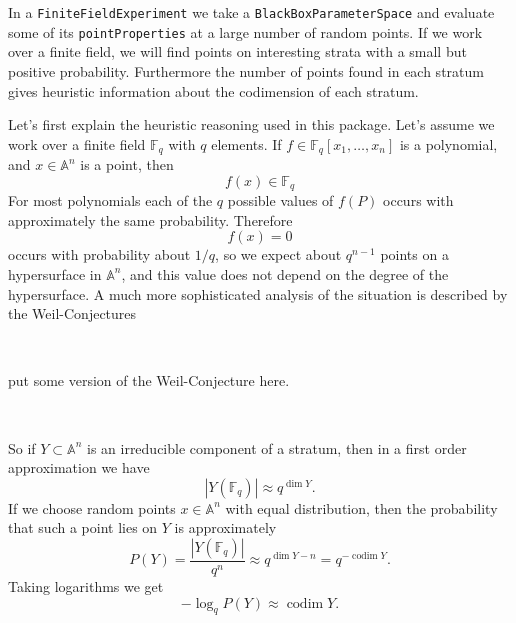 \documentclass[12pt,a4paper]{amsart}
\theoremstyle{plain}
\theoremstyle{definition}
\newcommand{\FF}{\mathbb F}
\renewcommand{\AA}{\mathbb A}
\DeclareMathOperator{\codim}{codim}
\begin{document}
In a {\tt FiniteFieldExperiment} we take a {\tt BlackBoxParameterSpace} and evaluate some of its {\tt pointProperties} at a large number of random points. If we work over a finite field, we will find points on interesting strata with a small but positive probability. Furthermore the number of points found in each stratum gives heuristic information about the codimension of each stratum.

Let's first explain the heuristic reasoning used in this package. Let's assume we work over a finite field $\FF_q$ with $q$ elements. If $f \in \FF_q[x_1,\dots,x_n]$ is a polynomial, and $x \in \AA^n$ is a point, then
\[
	f(x) \in \FF_q
\]
For most polynomials each of the $q$ possible values of $f(P)$ occurs with approximately the same probability. Therefore 
\[
	f(x) = 0
\]
occurs with probability about $1/q$, so we expect about $q^{n-1}$ points on a hypersurface in $\AA^n$, and this value does not depend on the degree of the hypersurface. A much more sophisticated analysis of the situation is described by the Weil-Conjectures 

\

{\color{red} put some version of the Weil-Conjecture here.}

\

So if $Y \subset \AA^n$ is an irreducible component of a stratum, then in a first order approximation we have
\[
	|Y(\FF_q) | \approx q^{\dim Y}.
\]
If we choose random points $x \in \AA^n$ with equal distribution, then the probability that such a point lies on $Y$ is approximately
\[
	P(Y) = \frac{|Y(\FF_q)|}{q^n} \approx q^{\dim Y - n} = q^{-\codim Y}.
\]
Taking logarithms we get
\[
	- \log_q P(Y) \approx \codim Y.
\]

\end{document}
